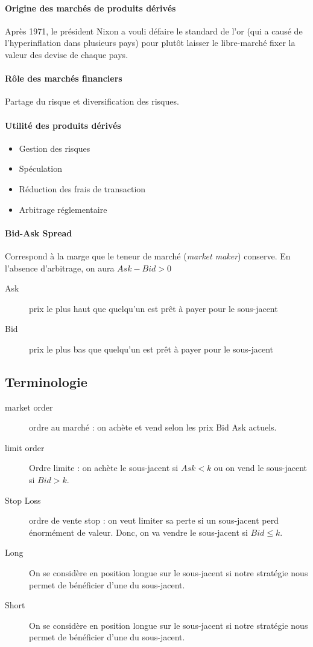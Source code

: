 \documentclass[10pt, french]{article}
\begin{document}
\begin{multicols*}{2}
\paragraph{Origine des marchés de produits dérivés} Après 1971, le président Nixon a vouli défaire le standard de l'or (qui a causé de l'hyperinflation dans plusieurs pays) pour plutôt laisser le libre-marché fixer la valeur des devise de chaque pays.

\paragraph{Rôle des marchés financiers} Partage du risque et diversification des risques.

\paragraph{Utilité des produits dérivés}
\begin{itemize}
\item Gestion des risques
\item Spéculation
\item Réduction des frais de transaction
\item Arbitrage réglementaire
\end{itemize}

\paragraph{Bid-Ask Spread} Correspond à la marge que le teneur de marché (\textit{market maker}) conserve. En l'absence d'arbitrage, on aura $Ask - Bid > 0$
\begin{description}
\item[Ask] prix le plus haut que quelqu'un est prêt à payer pour le sous-jacent
\item[Bid] prix le plus bas que quelqu'un est prêt à payer pour le sous-jacent
\end{description}

\subsection*{Terminologie}
\begin{description}
\item[market order] ordre au marché : on achète et vend selon les prix Bid Ask actuels.
\item[limit order] Ordre limite : on achète le sous-jacent si $Ask < k$ ou on vend le sous-jacent si $Bid > k$.
\item[Stop Loss] ordre de vente stop : on veut limiter sa perte si un sous-jacent perd énormément de valeur. Donc, on va vendre le sous-jacent si $Bid \leq k$.
\item[Long] On se considère en position longue sur le sous-jacent si notre stratégie nous permet de bénéficier d'une  du sous-jacent.
\item[Short] On se considère en position longue sur le sous-jacent si notre stratégie nous permet de bénéficier d'une  du sous-jacent.
\end{description}


\end{multicols*}
\end{document}
